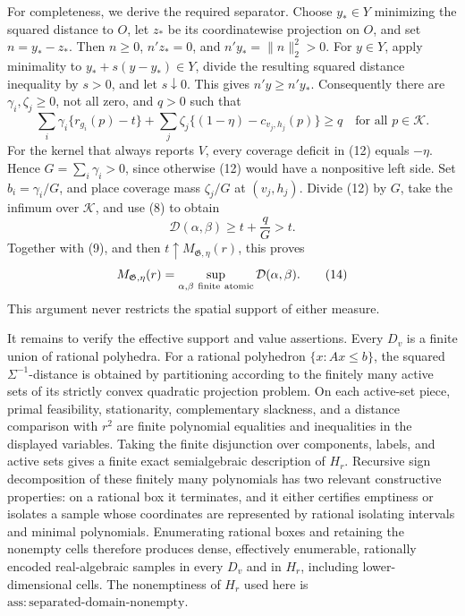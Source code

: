 For completeness, we derive the required separator.  Choose
\(y_*\in Y\) minimizing the squared distance to \(O\), let \(z_*\) be its
coordinatewise projection on \(O\), and set \(n=y_*-z_*\).  Then
\(n\geq0\), \(n'z_*=0\), and \(n'y_*=\|n\|_2^2>0\).  For \(y\in Y\),
apply minimality to \(y_*+s(y-y_*)\in Y\), divide the resulting squared
distance inequality by \(s>0\), and let \(s\downarrow0\).  This gives
\(n'y\geq n'y_*\).  Consequently there are
\(\gamma_i,\zeta_j\geq0\), not all zero, and \(q>0\) such that
\[
 \sum_i\gamma_i\{r_{g_i}(p)-t\}
 +\sum_j\zeta_j\{(1-\eta)-c_{v_j,h_j}(p)\}
 \geq q
 \quad\text{for all }p\in\mathscr K.
\tag{12}
\]
For the kernel that always reports \(V\), every coverage deficit in (12)
equals \(-\eta\).  Hence \(G=\sum_i\gamma_i>0\), since otherwise (12)
would have a nonpositive left side.  Set \(b_i=\gamma_i/G\), and place
coverage mass \(\zeta_j/G\) at \((v_j,h_j)\).  Divide (12) by \(G\), take
the infimum over \(\mathscr K\), and use (8) to obtain
\[
 \mathcal D(\alpha,\beta)\geq t+\frac qG>t.
\tag{13}
\]
Together with (9), and then \(t\uparrow M_{\mathfrak G,\eta}(r)\), this
proves
\[
 M_{\mathfrak G,\eta}(r)
 =\sup_{\alpha,\beta\ {\rm finite\ atomic}}\mathcal D(\alpha,\beta).
\tag{14}
\]
This argument never restricts the spatial support of either measure.

It remains to verify the effective support and value assertions.  Every
\(D_v\) is a finite union of rational polyhedra.  For a rational polyhedron
\(\{x:Ax\leq b\}\), the squared \(\Sigma^{-1}\)-distance is obtained by
partitioning according to the finitely many active sets of its strictly
convex quadratic projection problem.  On each active-set piece, primal
feasibility, stationarity, complementary slackness, and a distance
comparison with \(r^2\) are finite polynomial equalities and inequalities
in the displayed variables.  Taking the finite disjunction over components,
labels, and active sets gives a finite exact semialgebraic description of
\(H_r\).  Recursive sign decomposition of these finitely many polynomials
has two relevant constructive properties: on a rational box it terminates,
and it either certifies emptiness or isolates a sample whose coordinates
are represented by rational isolating intervals and minimal polynomials.
Enumerating rational boxes and retaining the nonempty cells therefore
produces dense, effectively enumerable, rationally encoded real-algebraic
samples in every \(D_v\) and in \(H_r\), including lower-dimensional cells.
The nonemptiness of \(H_r\) used here is
\(\mathrm{ass:separated\mbox{-}domain\mbox{-}nonempty}\).

